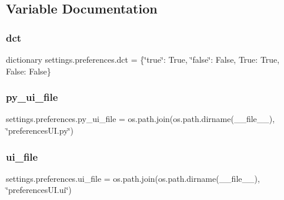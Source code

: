 \subsection{Variable Documentation}
\hypertarget{namespacesettings_1_1preferences_a733f21e501f603b086934c865c62d41d}{}\label{namespacesettings_1_1preferences_a733f21e501f603b086934c865c62d41d} 
\subsubsection{\texorpdfstring{dct}{dct}}
{\footnotesize\ttfamily dictionary settings.\+preferences.\+dct = \{\char`\"{}true\char`\"{}\+: True, \char`\"{}false\char`\"{}\+: False, True\+: True, False\+: False\}}

\hypertarget{namespacesettings_1_1preferences_ae7e022019493035187806fac02749517}{}\label{namespacesettings_1_1preferences_ae7e022019493035187806fac02749517} 
\subsubsection{\texorpdfstring{py\+\_\+ui\+\_\+file}{py\_ui\_file}}
{\footnotesize\ttfamily settings.\+preferences.\+py\+\_\+ui\+\_\+file = os.\+path.\+join(os.\+path.\+dirname(\+\_\+\+\_\+file\+\_\+\+\_\+), \char`\"{}preferences\+U\+I.\+py\char`\"{})}

\hypertarget{namespacesettings_1_1preferences_a033eb50e8b7b2de7816c6e423cf89fa2}{}\label{namespacesettings_1_1preferences_a033eb50e8b7b2de7816c6e423cf89fa2} 
\subsubsection{\texorpdfstring{ui\+\_\+file}{ui\_file}}
{\footnotesize\ttfamily settings.\+preferences.\+ui\+\_\+file = os.\+path.\+join(os.\+path.\+dirname(\+\_\+\+\_\+file\+\_\+\+\_\+), \char`\"{}preferences\+U\+I.\+ui\char`\"{})}

